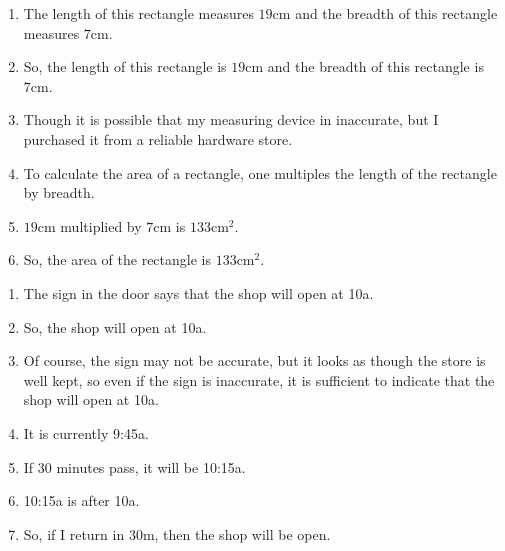 \begin{note}
  \begin{illustration}
    \label{ill:rectangle:basic}
    \mbox{}
    \vspace{-\baselineskip}
    \begin{enumerate}
    \item The length of this rectangle measures \(19\text{cm}\) and the breadth of this rectangle measures \(7\text{cm}\).
    \item So, the length of this rectangle is \(19\text{cm}\) and the breadth of this rectangle is \(7\text{cm}\).
    \item\label{ill:rectangle:basic:reasoning} Though it is possible that my measuring device in inaccurate, but I purchased it from a reliable hardware store.
    \item To calculate the area of a rectangle, one multiples the length of the rectangle by breadth.
    \item\label{ill:rectangle:basic:reasoning} \(19\text{cm}\) multiplied by \(7\text{cm}\) is \(133\text{cm}^{2}\).
    \item So, the area of the rectangle is \(133\text{cm}^{2}\).
    \end{enumerate}
    \vspace{-\baselineskip}
  \end{illustration}
\end{note}

\begin{note}
  \begin{illustration}
    \label{ill:waiting-for-shop}
    \mbox{}
    \vspace{-\baselineskip}
    \begin{enumerate}
    \item The sign in the door says that the shop will open at 10a.
    \item So, the shop will open at 10a.
    \item\label{ill:waiting-for-shop:reasoning} Of course, the sign may not be accurate, but it looks as though the store is well kept, so even if the sign is inaccurate, it is sufficient to indicate that the shop will open at 10a.
    \item\label{ill:waiting-for-shop:current-time} It is currently 9:45a.
    \item If 30 minutes pass, it will be 10:15a.
    \item 10:15a is after 10a.
    \item\label{ill:waiting-for-shop:return} So, if I return in 30m, then the shop will be open.
    \end{enumerate}
    \vspace{-\baselineskip}
  \end{illustration}
\end{note}

